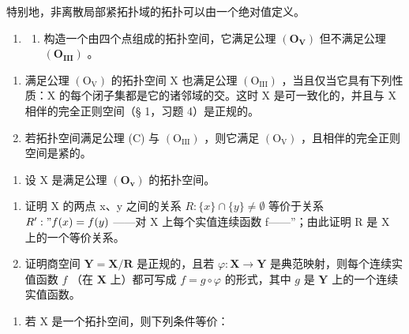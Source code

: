 特别地，非离散局部紧拓扑域的拓扑可以由一个绝对值定义。

\ExerciseSection

\begin{enumerate}
\def\labelenumi{\roman{enumi})}
\tightlist
\item
  \begin{enumerate}
  \def\labelenumii{\alph{enumii})}
  \tightlist
  \item
    构造一个由四个点组成的拓扑空间，它满足公理 \((\mathbf{O}_{\mathbf{V}})\) 但不满足公理 \((\mathbf{O}_{\mathbf{III}})\) 。
  \end{enumerate}
\end{enumerate}

\begin{enumerate}
\def\labelenumi{\alph{enumi})}
\setcounter{enumi}{1}
\item
  满足公理 \((\mathrm{O}_{\mathrm{V}})\) 的拓扑空间 X 也满足公理 \((\mathrm{O}_{\mathrm{III}})\) ，当且仅当它具有下列性质：X 的每个闭子集都是它的诸邻域的交。这时 X 是可一致化的，并且与 X 相伴的完全正则空间（§ 1，习题 4）是正规的。
\item
  若拓扑空间满足公理 (C) 与 \((\mathrm{O}_{\mathrm{III}})\) ，则它满足 \((\mathrm{O}_{\mathrm{V}})\) ，且相伴的完全正则空间是紧的。
\end{enumerate}

\begin{enumerate}
\def\labelenumi{\arabic{enumi})}
\setcounter{enumi}{1}
\tightlist
\item
  设 X 是满足公理 \((\mathbf{O}_{\mathbf{v}})\) 的拓扑空间。
\end{enumerate}

\begin{enumerate}
\def\labelenumi{\alph{enumi})}
\item
  证明 X 的两点 x、y 之间的关系 \(R: \{x\} \cap \{y\} \neq \emptyset\) 等价于关系 \(R' : "f(x) = f(y)\) ——对 X 上每个实值连续函数 f——''；由此证明 R 是 X 上的一个等价关系。
\item
  证明商空间 \(\mathbf{Y} = \mathbf{X} / \mathbf{R}\) 是正规的，且若 \(\varphi: \mathbf{X} \to \mathbf{Y}\) 是典范映射，则每个连续实值函数 \(f\) （在 \(\mathbf{X}\) 上）都可写成 \(f = g \circ \varphi\) 的形式，其中 \(g\) 是 \(\mathbf{Y}\) 上的一个连续实值函数。
\end{enumerate}

\begin{enumerate}
\def\labelenumi{\arabic{enumi})}
\setcounter{enumi}{2}
\tightlist
\item
  若 X 是一个拓扑空间，则下列条件等价：
\end{enumerate}

